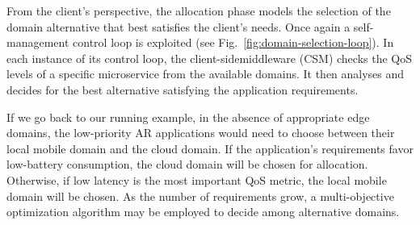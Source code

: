 
From the client's perspective, the allocation phase models the selection of the domain alternative that best satisfies the client's needs. Once again a self-management control loop is exploited (see Fig.~\ref{fig:domain-selection-loop}). In each instance of its control loop, the client-sidemiddleware (CSM) checks the QoS levels of a specific microservice from the available domains. It then analyses and decides for the best alternative satisfying the application requirements.




If we go back to our running example, in the absence of appropriate edge domains, the low-priority AR applications would need to choose between their local mobile domain and the cloud domain. If the application's requirements favor low-battery consumption, the cloud domain will be chosen for allocation. Otherwise, if low latency is the most important QoS metric, the local mobile domain will be chosen. As the number of requirements grow, a multi-objective optimization algorithm may be employed to decide among alternative domains.




